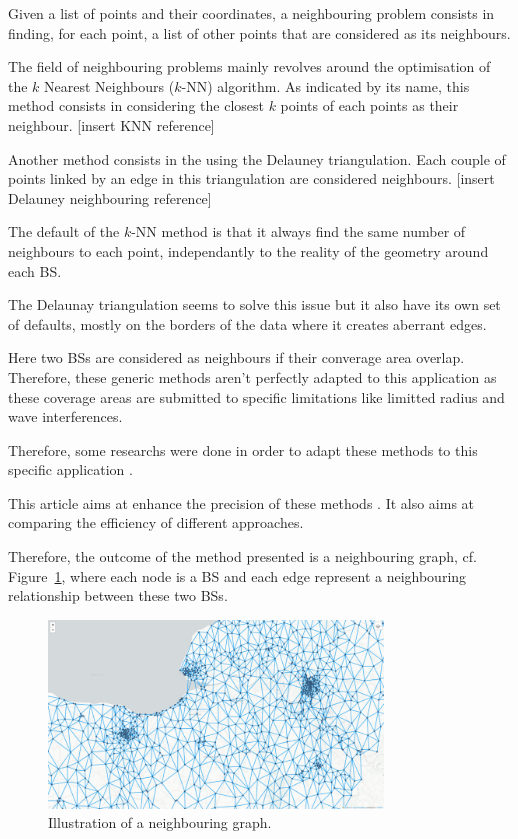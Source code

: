 \documentclass[lettersize,journal,english]{IEEEtran}
\begin{document}
    Given a list of points and their coordinates, a neighbouring problem consists in finding, for each point, a list of other points that are considered as its neighbours.

    The field of neighbouring problems mainly revolves around the optimisation of the $k$ Nearest Neighbours ($k$-NN) algorithm.
    As indicated by its name, this method consists in considering the closest $k$ points of each points as their neighbour.
    [insert KNN reference]

    Another method consists in the using the Delauney triangulation. Each couple of points linked by an edge in this triangulation are considered neighbours.
    [insert Delauney neighbouring reference]

    The default of the $k$-NN method is that it always find the same number of neighbours to each point, independantly to the reality of the geometry around each BS.
    
    The Delaunay triangulation seems to solve this issue but it also have its own set of defaults, mostly on the borders of the data where it creates aberrant edges.

    Here two BSs are considered as neighbours if their converage area overlap. Therefore, these generic methods aren't perfectly adapted to this application as these coverage areas are submitted to specific limitations like limitted radius and wave interferences.

    Therefore, some researchs were done in order to adapt these methods to this specific application \cite{patent_neighs}.

    This article aims at enhance the precision of these methods . It also aims at comparing the efficiency of different approaches. 

    Therefore, the outcome of the method presented is a neighbouring graph, cf. Figure~\ref{fig:neigh_graph}, where each node is a BS and each edge represent a neighbouring relationship between these two BSs.
    \begin{figure}
        \centering
        \includegraphics[width=3.5in]{images/illus_graphs/neighbouring_graph.png}
        \caption{Illustration of a neighbouring graph.}
        \label{fig:neigh_graph}
    \end{figure}
\end{document}
